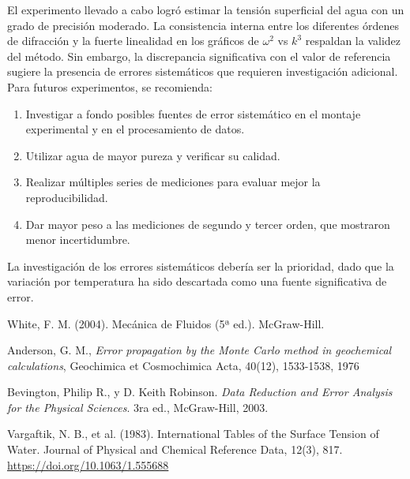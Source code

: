 El experimento llevado a cabo logró estimar la tensión superficial del agua con un grado de precisión moderado. La consistencia interna entre los diferentes órdenes de difracción y la fuerte linealidad en los gráficos de $\omega^2$ vs $k^3$ respaldan la validez del método. Sin embargo, la discrepancia significativa con el valor de referencia sugiere la presencia de errores sistemáticos que requieren investigación adicional. Para futuros experimentos, se recomienda:

\begin{enumerate}
\item Investigar a fondo posibles fuentes de error sistemático en el montaje experimental y en el procesamiento de datos.
\item Utilizar agua de mayor pureza y verificar su calidad.
\item Realizar múltiples series de mediciones para evaluar mejor la reproducibilidad.
\item Dar mayor peso a las mediciones de segundo y tercer orden, que mostraron menor incertidumbre.
\end{enumerate}

La investigación de los errores sistemáticos debería ser la prioridad, dado que la variación por temperatura ha sido descartada como una fuente significativa de error.


\begin{thebibliography}{99}
	
	White, F. M. (2004). Mecánica de Fluidos (5ª ed.). McGraw-Hill.


	 Anderson, G. M., \textit{Error propagation by the Monte Carlo method in geochemical calculations}, Geochimica et Cosmochimica Acta, 40(12), 1533-1538, 1976

	 Bevington, Philip R., y D. Keith Robinson. \textit{Data Reduction and Error Analysis for the Physical Sciences}. 3ra ed., McGraw-Hill, 2003.
	
	Vargaftik, N. B., et al. (1983). International Tables of the Surface Tension of Water. Journal of Physical and Chemical Reference Data, 12(3), 817. \url{https://doi.org/10.1063/1.555688}
	
	
	
	
\end{thebibliography}





    
   

